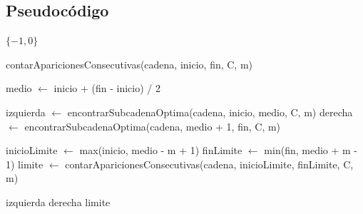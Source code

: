 \documentclass[12pt,a4paper]{article}
\begin{document}
\subsection{Pseudocódigo}
\begin{algorithm}[H]
\caption{Encontrar Subcadena Óptima}
\begin{algorithmic}[1]
        \State \Return $\{-1, 0\}$
    \EndIf
    
        \State \Return contarAparicionesConsecutivas(cadena, inicio, fin, C, m)
    \EndIf
    
    \State medio $\gets$ inicio + (fin - inicio) / 2
    
    \State izquierda $\gets$ encontrarSubcadenaOptima(cadena, inicio, medio, C, m)
    \State derecha $\gets$ encontrarSubcadenaOptima(cadena, medio + 1, fin, C, m)
    
    \State inicioLimite $\gets$ max(inicio, medio - m + 1)
    \State finLimite $\gets$ min(fin, medio + m - 1)
    \State limite $\gets$ contarAparicionesConsecutivas(cadena, inicioLimite, finLimite, C, m)
    
        \State \Return izquierda
        \State \Return derecha
    \Else
        \State \Return limite
    \EndIf
\EndFunction
\end{algorithmic}
\end{algorithm}
\end{document}
